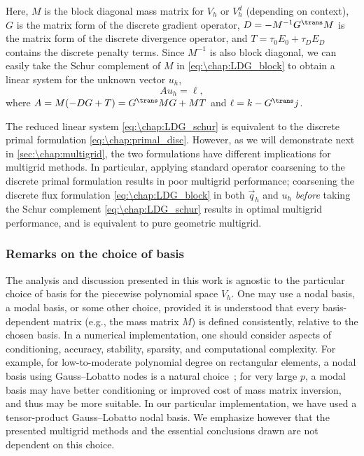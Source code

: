 Here, $M$ is the block diagonal mass matrix for $V_h$ or $V_h^d$ (depending on context), $G$ is the matrix form of the discrete gradient operator, $D = -M^{-1} G^\trans M$ is the matrix form of the discrete divergence operator, and $T = \tau_0 E_0 + \tau_D E_D$ contains the discrete penalty terms. Since $M^{-1}$ is also block diagonal, we can easily take the Schur complement of $M$ in \cref{eq:\chap:LDG_block} to obtain a linear system for the unknown vector $u_h$,
\begin{equation}\label{eq:\chap:LDG_schur}
A u_h = \ell,
\end{equation}
where $A = M (-D G + T) = G^\trans M G + M T$ and $\ell = k - G^\trans j$.

The reduced linear system \cref{eq:\chap:LDG_schur} is equivalent to the discrete primal formulation \cref{eq:\chap:primal_disc}. However, as we will demonstrate next in \cref{sec:\chap:multigrid}, the two formulations have different implications for multigrid methods. In particular, applying standard operator coarsening to the discrete primal formulation results in poor multigrid performance; coarsening the discrete flux formulation \cref{eq:\chap:LDG_block} in both $\vec{q}_h$ and $u_h$ \emph{before} taking the Schur complement \cref{eq:\chap:LDG_schur} results in optimal multigrid performance, and is equivalent to pure geometric multigrid.

\subsubsection{Remarks on the choice of basis}\label{sec:\chap:choicebasis}

The analysis and discussion presented in this work is agnostic to the particular choice of basis for the piecewise polynomial space $V_h$. One may use a nodal basis, a modal basis, or some other choice, provided it is understood that every basis-dependent matrix (e.g., the mass matrix $M$) is defined consistently, relative to the chosen basis. In a numerical implementation, one should consider aspects of conditioning, accuracy, stability, sparsity, and computational complexity. For example, for low-to-moderate polynomial degree on rectangular elements, a nodal basis using Gauss--Lobatto nodes is a natural choice~\cite{Hesthaven_08_01}; for very large $p$, a modal basis may have better conditioning or improved cost of mass matrix inversion, and thus may be more suitable. In our particular implementation, we have used a tensor-product Gauss--Lobatto nodal basis. We emphasize however that the presented multigrid methods and the essential conclusions drawn are not dependent on this choice.

